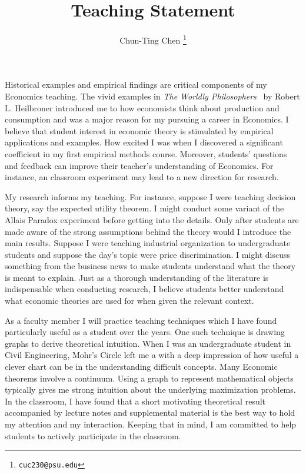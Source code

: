 \documentclass[12pt,letter]{article}
\theoremstyle{definition}
\theoremstyle{remark}
\theoremstyle{claim}
\begin{document}

\title {Teaching Statement}
\author{Chun-Ting Chen%
  \thanks{\texttt{cuc230@psu.edu}}}
\date{}

\maketitle

Historical examples and empirical findings are critical components of my Economics teaching. The vivid examples in \textit{The Worldly Philosophers}~ by Robert L. Heilbroner introduced me to how economists think about production and consumption and was a major reason for my pursuing a career in Economics.  I believe that student interest in economic theory is stimulated by empirical applications and examples. How excited I was when I discovered a significant coefficient in my first empirical methods course. Moreover, students' questions and feedback can improve their teacher's understanding of Economics. For instance, an classroom experiment may lead to a new direction for research.

My research informs my teaching. For instance, suppose I were teaching decision theory, say the expected utility theorem. I might conduct some variant of the Allais Paradox experiment before getting into the details. Only after students are made aware of the strong assumptions behind the theory would I introduce the main results. Suppose I were teaching industrial organization to undergraduate students and suppose the day's topic were price discrimination. I might discuss something from the business news to make students understand what the theory is meant to explain. Just as a thorough understanding of the literature is indispensable when conducting research, I believe students better understand what economic theories are used for when given the relevant context.

As a faculty member I will practice teaching techniques which I have found particularly useful as a student over the years. One such technique is drawing graphs to derive theoretical intuition. When I was an undergraduate student in Civil Engineering, Mohr's Circle left me a with a deep impression of how useful a clever chart can be in the understanding difficult concepts. Many Economic theorems involve a continuum. Using a graph to represent mathematical objects typically gives me strong intuition about the underlying maximization problems. In the classroom, I have found that a short motivating theoretical result accompanied by lecture notes and supplemental material is the best way to hold my attention and my interaction. Keeping that in mind, I am committed to help students to actively participate in the classroom.
\end{document}
